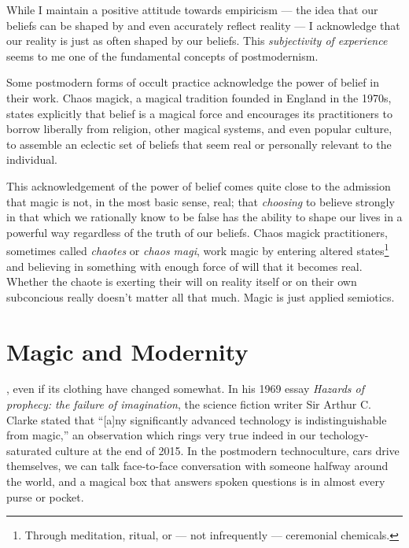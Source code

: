 \documentclass[a4paper,nobib]{tufte-handout}
\begin{document}
While I maintain a positive attitude towards empiricism --- the idea that our beliefs can be shaped by and even accurately reflect reality\autocite{sep:logicalempiricism} --- I acknowledge that our reality is just as often shaped by our beliefs. This \emph{subjectivity of experience}\autocite{nagel1974like} seems to me one of the fundamental concepts of postmodernism.

Some postmodern forms of occult practice acknowledge the power of belief in their work. Chaos magick, a magical tradition founded in England in the 1970s, states explicitly that belief is a magical force and encourages its practitioners to borrow liberally from religion, other magical systems, and even popular culture, to assemble an eclectic set of beliefs that seem real or personally relevant to the individual.\autocite{carroll1987liber,carroll1992liber,sherwin1992book}

This acknowledgement of the power of belief comes quite close to the admission that magic is not, in the most basic sense, real; that \emph{choosing} to believe strongly in that which we rationally know to be false has the ability to shape our lives in a powerful way regardless of the truth of our beliefs. Chaos magick practitioners, sometimes called \emph{chaotes} or \emph{chaos magi}, work magic by entering altered states\footnote{Through meditation, ritual, or --- not infrequently --- ceremonial chemicals.} and believing in something with enough force of will that it becomes real.\autocite{carroll1987liber,carroll1992liber,sherwin1992book}  Whether the chaote is exerting their will on reality itself or on their own subconcious really doesn't matter all that much. Magic is just applied semiotics.

\section{Magic and Modernity}

, even if its clothing have changed somewhat. In his 1969 essay \emph{Hazards of prophecy: the failure of imagination}, the science fiction writer Sir Arthur C. Clarke stated that ``[a]ny significantly advanced technology is indistinguishable from magic,''\autocite{clarke1962hazards} an observation which rings very true indeed in our techology-saturated culture at the end of 2015. In the postmodern technoculture, cars drive themselves, we can talk face-to-face conversation with someone halfway around the world, and a magical box that answers spoken questions is in almost every purse or pocket.
\end{document}

